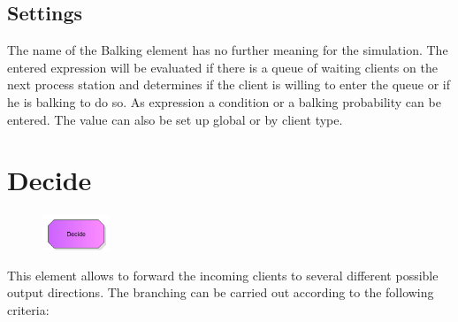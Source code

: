 \subsection*{Settings}

The name of the Balking element has no further meaning for the simulation.
The entered expression will be evaluated if there is a queue of waiting
clients on the next process station and determines if the client is willing
to enter the queue or if he is balking to do so. As expression a condition or
a balking probability can be entered. The value can also be set up global or
by client type.


\section{Decide}
\label{ref:ModelElementDecide}

\begin{figure}
\vspace{-22pt}
\includegraphics[width=2cm]{imageModelElementDecide.png}
\vspace{-22pt}
\end{figure}

This element allows to forward the incoming clients to several different possible output directions.
The branching can be carried out according to the following criteria:

